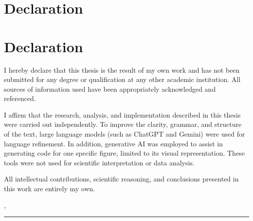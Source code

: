 %
\chapter*{Declaration}
\label{sec:declaration}
\thispagestyle{empty}
\chapter*{Declaration}

I hereby declare that this thesis is the result of my own work and has not been submitted for any degree or qualification at any other academic institution. All sources of information used have been appropriately acknowledged and referenced.

I affirm that the research, analysis, and implementation described in this thesis were carried out independently. To improve the clarity, grammar, and structure of the text, large language models (such as ChatGPT and Gemini) were used for language refinement. In addition, generative AI was employed to assist in generating code for one specific figure, limited to its visual representation. These tools were not used for scientific interpretation or data analysis.

All intellectual contributions, scientific reasoning, and conclusions presented in this work are entirely my own.

\bigskip

\noindent\textit{\thesisUniversityCity, \thesisDateSubmission}

\smallskip

\begin{flushright}
	\begin{minipage}{5cm}
		\rule{\textwidth}{1pt}
		\centering\thesisName
	\end{minipage}
\end{flushright}

